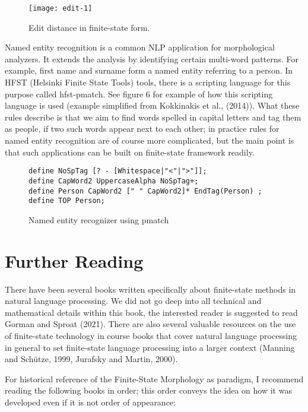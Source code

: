 \documentclass[free]{flammie}
\begin{document}
\begin{figure}
    \texttt{[image: edit-1]}
    \caption{Edit distance in finite-state form.\label{fig:freag}}
\end{figure}

Named entity recognition is a common NLP application for morphological analyzers. It
extends the analysis by identifying certain multi-word patterns. For example, first name
and surname form a named entity referring to a person. In HFST (Helsinki Finite State
Tools) tools, there is a scripting language for this purpose called hfst-pmatch. See figure
6 for example of how this scripting language is used (example simplified from Kokkinakis
et al., (2014)). What these rules describe is that we aim to find words spelled in capital
letters and tag them as people, if two such words appear next to each other; in practice rules
for named entity recognition are of course more complicated, but the main point is that
such applications can be built on finite-state framework readily.

\begin{figure}
    \begin{verbatim}
define NoSpTag [? - [Whitespace|"<"|">"]];
define CapWord2 UppercaseAlpha NoSpTag+;
define Person CapWord2 [" " CapWord2]* EndTag(Person) ;
define TOP Person;
\end{verbatim}
    \caption{Named entity recognizer using pmatch\label{fig:ner}}
\end{figure}

\section{Further Reading}

There have been several books written specifically about finite-state methods in natural
language processing. We did not go deep into all technical and mathematical details within
this book, the interested reader is suggested to read Gorman and Sproat (2021). There are
also several valuable resources on the use of finite-state technology in course books that
cover natural language processing in general to set finite-state language processing into a
larger context (Manning and Schütze, 1999, Jurafsky and Martin, 2000).

For historical reference of the Finite-State Morphology as paradigm, I recommend
reading the following books in order; this order conveys the idea on how it was developed
even if it is not order of appearance:
\end{document}
